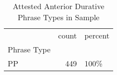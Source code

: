\begin{table}[htbp!]
\centering
\caption{Attested Anterior Durative Phrase Types in Sample}
\label{table:antdur_phtype_ct}
\begin{tabular}{lrl}
\toprule
{} &  count & percent \\
Phrase Type &        &         \\
\midrule
PP          &    449 &    100\% \\
\bottomrule
\end{tabular}
\end{table}
